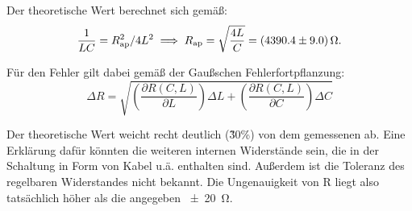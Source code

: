 Der theoretische Wert berechnet sich gemäß:
\begin{equation}
  \frac{1}{LC} = R_\text{ap}^2/4L^2 \\
  \implies R_\text{ap} = \sqrt{\frac{4L}{C}} = \SI{4390.4 \pm 9.0}{\ohm}.
\end{equation}

Für den Fehler gilt dabei gemäß der Gaußschen Fehlerfortpflanzung:
\begin{equation}
  \Delta R = \sqrt{\left( \frac{\partial R(C,L)}{\partial L}\right) \Delta L
  + \left( \frac{\partial R(C,L)}{\partial C} \right) \Delta C}
  \label{eqn:gauss}
\end{equation}

Der theoretische Wert weicht recht deutlich (\~30\%) von dem gemessenen ab.
Eine Erklärung dafür könnten die weiteren internen Widerstände sein, die in
der Schaltung in Form von Kabel u.ä. enthalten sind. Außerdem ist die Toleranz
des regelbaren Widerstandes nicht bekannt. Die Ungenauigkeit von R liegt also
tatsächlich höher als die angegeben \SI{+-20}{\ohm}.

